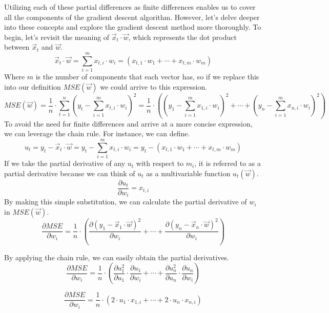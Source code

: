 Utilizing each of these partial differences as finite differences enables us to cover all the components of
the gradient descent algorithm. However, let's delve deeper into these concepts and explore the gradient
descent method more thoroughly. To begin, let's revisit the meaning of $\vec{x}_t \cdot \vec{w}$, which
represents the dot product between $\vec{x}_t$ and $\vec{w}$.
\[
\vec{x}_t \cdot \vec{w} = \sum_{i = 1}^{m} x_{t, i} \cdot w_i = (x_{t, 1} \cdot w_1 + \cdots + x_{t, m} \cdot w_m)
\]
Where $m$ is the number of components that each vector has, so if we replace this into our definition
$MSE(\vec{w})$ we could arrive to this expression.
\[
MSE(\vec{w}) = \frac{1}{n} \cdot \sum_{t = 1}^{n}(y_t - \sum_{i = 1}^{m}x_{t, i} \cdot w_i)^2
= \frac{1}{n} \cdot ((y_1 - \sum_{i = 1}^{m}x_{1, i} \cdot w_i)^2 + \cdots + (y_n - \sum_{i = 1}^{m}x_{n, i} \cdot w_i)^2)
\]
To avoid the need for finite differences and arrive at a more concise expression, we can leverage the
chain rule. For instance, we can define.
\[
u_t = y_t - \vec{x}_t \cdot \vec{w} = y_t - \sum_{i = 1}^{m}x_{t, i} \cdot w_i
= y_t - (x_{t, 1} \cdot w_1 + \cdots + x_{t, m} \cdot w_m)
\]
If we take the partial derivative of any $u_t$ with respect to $m_i$, it is referred to as a partial derivative
because we can think of $u_t$ as a multivariable function $u_t(\vec{w})$.
\[
\frac{\partial u_t}{\partial w_i} = x_{t, i}
\]
By making this simple substitution, we can calculate the partial derivative of $w_i$ in $MSE(\vec{w})$.
\[
\frac{\partial MSE}{\partial w_i} = \frac{1}{n} \cdot (
\frac{\partial (y_1 - \vec{x}_1 \cdot \vec{w})^2}{\partial w_i} + \cdots +
\frac{\partial (y_n - \vec{x}_n \cdot \vec{w})^2}{\partial w_i})
\]

By applying the chain rule, we can easily obtain the partial derivatives.
\[
\frac{\partial MSE}{\partial w_i} = \frac{1}{n} \cdot (
\frac{\partial u_1^2}{\partial u_1} \cdot \frac{\partial u_1}{\partial w_i} + \cdots +
\frac{\partial u_n^2}{\partial u_n} \cdot \frac{\partial u_n}{\partial w_i})
\]

\[
\frac{\partial MSE}{\partial w_i} = \frac{1}{n} \cdot (
2 \cdot u_1 \cdot x_{1, i} + \cdots +
2 \cdot u_n \cdot x_{n, i})
\]

